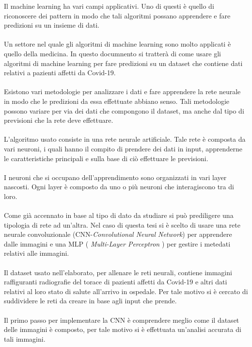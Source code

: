 Il machine learning ha vari campi applicativi.
Uno di questi è quello di riconoscere dei pattern in modo che tali algoritmi possano apprendere e fare predizioni su un insieme di dati.
\\\\
Un settore nel quale gli algoritmi di machine learning sono molto applicati è quello della medicina.
In questo documnento si tratterà di come usare gli algoritmi di machine learning per fare predizioni su un dataset che contiene dati relativi a pazienti affetti da Covid-19.
\\\\
Esistono vari metodologie per analizzare i dati e fare apprendere la rete neurale in modo che le predizioni da essa effettuate abbiano senso.
Tali metodologie possono variare per via dei dati che compongono il dataset, ma anche dal tipo di previsioni che la rete deve effettuare.
\\\\
L'algoritmo usato consiste in una rete neurale artificiale.
Tale rete è composta da vari neuroni, i quali hanno il compito di prendere dei dati in input, apprenderne le caratteristiche principali e sulla base di ciò effettuare le previsioni.
\\\\
I neuroni che si occupano dell'apprendimento sono organizzati in vari layer nascosti. Ogni layer è composto da uno o più neuroni che interagiscono tra di loro. 
\\\\
Come già accennato in base al tipo di dato da studiare si può prediligere una tipologia di rete ad un'altra.
Nel caso di questa tesi si è scelto di usare una rete neurale convoluzionale (CNN-\emph{Convolutional Neural Network}) per apprendere dalle immagini e una MLP ( \emph{Multi-Layer Perceptron} ) per gestire i metedati relativi alle immagini.
\\\\
Il dataset usato nell'elaborato, per allenare le reti neurali, contiene immagini raffiguranti radiografie del torace 
di pazienti affetti da Covid-19 e altri dati relativi al loro stato di salute all'arrivo in ospedale. Per tale motivo 
si è cercato di suddividere le reti da creare in base agli input che prende.
\\\\
Il primo passo per implementare la CNN è comprendere meglio come il dataset delle immagini è composto, per tale motivo 
si è effettuata un'analisi accurata di tali immagini.
